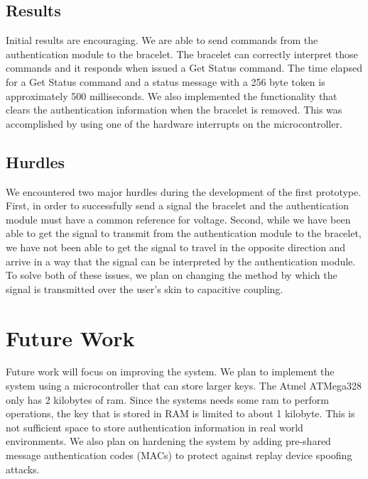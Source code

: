 \documentclass[runningheads,a4paper]{llncs}
\begin{document}
\subsection{Results}
Initial results are encouraging.  We are able to send commands from the authentication module to the bracelet.  The bracelet can correctly interpret those commands and it responds when issued a Get Status command.   The time elapsed for a Get Status command and a status message with a 256 byte token is approximately 500 milliseconds.  
We also implemented the functionality that clears the authentication information when the bracelet is removed.  This was accomplished by using one of the hardware interrupts on the microcontroller. 
\subsection{Hurdles}
We encountered two major hurdles during the development of the first prototype.  First, in order to successfully send a signal the bracelet and the authentication module must have a common reference for voltage.  Second, while we have been able to get the signal to transmit from the authentication module to the bracelet, we have not been able to get the signal to travel in the opposite direction and arrive in a way that the signal can be interpreted by the authentication module.  To solve both of these issues, we plan on changing the method by which the signal is transmitted over the user's skin to capacitive coupling.


\section{Future Work}\label{sec:future}
Future work will focus on improving the system.  We plan to implement the system using a microcontroller that can store larger keys.  The Atmel ATMega328 only has 2 kilobytes of ram.  Since the systems needs some ram to perform operations, the key that is stored in RAM is limited to about 1 kilobyte.  This is not sufficient space to store authentication information in real world environments.  We also plan on hardening the system by adding pre-shared message authentication codes (MACs) to protect against replay device spoofing attacks.

\end{document}
